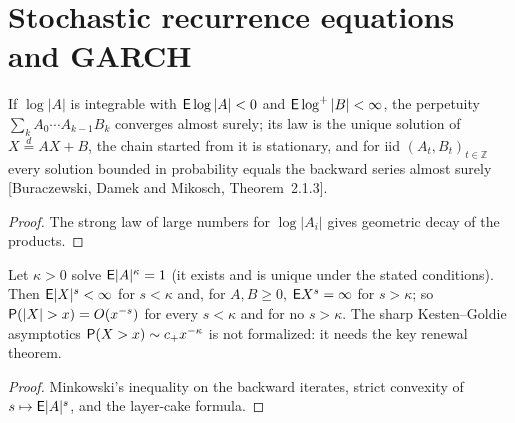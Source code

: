 \section{Stochastic recurrence equations and GARCH}

\begin{theorem}[Stationary solution of \texorpdfstring{$X = AX + B$}{X = AX + B}]
  \label{thm:sre-stationary}
  \leanok
  If $\log|A|$ is integrable with $\mathsf{E}\log|A| < 0$ and $\mathsf{E}\log^+|B| < \infty$, the perpetuity $\sum_k A_0\cdots A_{k-1}B_k$
  converges almost surely; its law is the unique solution of $X \overset{d}{=} AX + B$, the chain started from it is stationary,
  and for iid $(A_t, B_t)_{t \in \mathbb Z}$ every solution bounded in probability equals the backward series almost surely
  [Buraczewski, Damek and Mikosch, Theorem~2.1.3].
\end{theorem}
\begin{proof}
  \leanok
  The strong law of large numbers for $\log|A_i|$ gives geometric decay of the products.
\end{proof}

\begin{theorem}
  \label{thm:sre-tails}
  \leanok
  Let $\kappa > 0$ solve $\mathsf{E}|A|^\kappa = 1$ (it exists and is unique under the stated conditions). Then $\mathsf{E}|X|^s < \infty$ for
  $s < \kappa$ and, for $A, B \ge 0$, $\mathsf{E} X^s = \infty$ for $s > \kappa$; so $\mathsf{P}(|X| > x) = O(x^{-s})$ for every $s < \kappa$ and
  for no $s > \kappa$. The sharp Kesten--Goldie asymptotics $\mathsf{P}(X > x) \sim c_+ x^{-\kappa}$ is not formalized: it needs the key
  renewal theorem.
\end{theorem}
\begin{proof}
  \leanok
  Minkowski's inequality on the backward iterates, strict convexity of $s \mapsto \mathsf{E}|A|^s$, and the layer-cake formula.
\end{proof}

